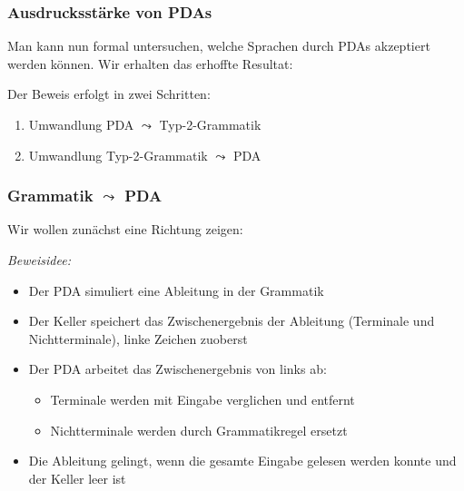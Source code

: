 \documentclass[aspectratio=1610,onlymath]{beamer}
\begin{document}
\begin{frame}\frametitle{Ausdrucksstärke von PDAs}

Man kann nun formal untersuchen, welche Sprachen durch PDAs akzeptiert werden können.
Wir erhalten das erhoffte Resultat:\medskip

\pause\bigskip

Der Beweis erfolgt in zwei Schritten:
\begin{enumerate}[(1)]
\item Umwandlung PDA $\leadsto$ Typ-2-Grammatik
\item Umwandlung Typ-2-Grammatik $\leadsto$ PDA
\end{enumerate}

\end{frame}

\begin{frame}[t]\frametitle{Grammatik $\leadsto$ PDA}

Wir wollen zunächst eine Richtung zeigen:

\pause\bigskip

\emph{Beweisidee:}
\begin{itemize}
\item Der PDA simuliert eine Ableitung in der Grammatik
\item Der Keller speichert das Zwischenergebnis der Ableitung (Terminale und Nichtterminale), linke Zeichen zuoberst
\item Der PDA arbeitet das Zwischenergebnis von links ab:
\begin{itemize}
\item Terminale werden mit Eingabe verglichen und entfernt
\item Nichtterminale werden durch Grammatikregel ersetzt
\end{itemize}
\item Die Ableitung gelingt, wenn die gesamte Eingabe gelesen werden konnte und der Keller leer ist
\end{itemize}

\end{frame}
\end{document}
